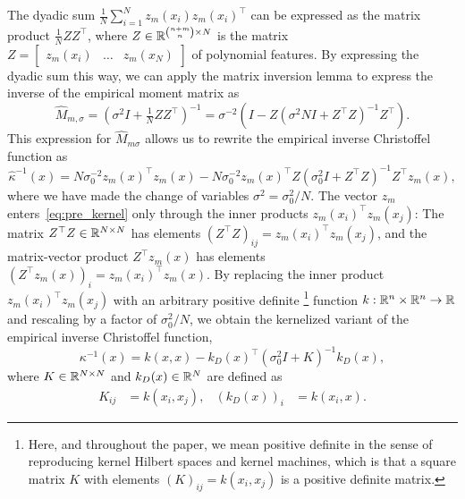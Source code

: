 \documentclass[onefignum,onetabnum]{siamart171218}
\begin{document}
The dyadic sum $\frac{1}{N}\sum_{i=1}^N z_m(x_i)z_m(x_i)^\top$ can be expressed
as the matrix product $\frac{1}{N} Z Z^\top$, where
$Z\in\mathbb{R}^{\binom{n+m}{n}\times N}$ is the matrix
    $
    Z =
    \begin{bmatrix}
        z_m(x_i) & \hdots & z_m(x_N)
    \end{bmatrix}
    $
of polynomial features.
By expressing the dyadic sum this way, we can apply
the matrix inversion lemma to express the inverse of the empirical moment
matrix
as
\begin{equation}
    \label{eq:empirical_moment_matrix_mil}
    \hat{M}_{m,\sigma} = 
    \left(
        \sigma^2 I 
        + 
        \tfrac{1}{N}
        Z Z^\top
    \right)^{-1}
    =
    \sigma^{-2}\left(I - Z\left(\sigma^2 N I + Z^\top
    Z\right)^{-1}Z^\top\right).
\end{equation}
This expression for $\hat{M}_{m\sigma}$ allows us to rewrite
the empirical inverse Christoffel function as
\begin{equation}
    \label{eq:pre_kernel}
    \hat{\kappa}^{-1}(x)
    =
    N
    \sigma_0^{-2} z_m(x)^\top z_m(x)
    -
    N
    \sigma_0^{-2} z_m(x)^\top Z \left(\sigma_0^2 I + Z^\top Z\right)^{-1}Z^\top z_m(x),
\end{equation}
where we have made the change of variables $\sigma^2=\sigma_0^2/N$.
The vector $z_m$ enters~\eqref{eq:pre_kernel} only through 
the inner products $z_m(x_i)^\top z_m(x_j)$:
The matrix $Z^\top Z\in\mathbb{R}^{N\times N}$ has elements 
$(Z^\top Z)_{ij}=z_m(x_i)^\top z_m(x_j)$, and the matrix-vector product
$Z^\top z_m(x)$ has elements 
$(Z^\top z_m(x))_i=z_m(x_i)^\top z_m(x)$. 
By replacing the inner product
$z_m(x_i)^\top z_m(x_j)$ with
an arbitrary positive definite%
\footnote{Here, and throughout the paper, we mean positive definite in the
sense of reproducing kernel Hilbert spaces and kernel machines, which is
that a square matrix $K$ with elements $(K)_{ij}=k(x_i,x_j)$ is a positive definite
matrix.}
function $k:\mathbb{R}^{n}\times\mathbb{R}^{n}\to\mathbb{R}$ and rescaling by a factor of
$\sigma_0^{2}/N$, we obtain the kernelized variant of the empirical inverse
Christoffel function,
\begin{equation}
    \label{eq:kernel_cfun_def}
    \kappa^{-1}(x)
    =
    k(x,x) - k_D(x)^\top\left(\sigma_0^2 I + K\right)^{-1}k_D(x),
\end{equation}
%
%
%
where $K\in\mathbb{R}^{N\times N}$ and $k_D(x)\in\mathbb{R}^N$ are defined as
\begin{equation}
    \begin{aligned}
        \label{eq:gramian_and_kvec}
        K_{ij} &=k(x_i,x_j), &
        (k_D(x))_i &=k(x_i,x).
    \end{aligned}
\end{equation}
%
%
%
%
%
%
%
%
%
\end{document}
